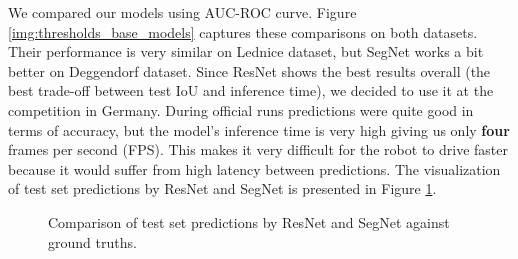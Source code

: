 We compared our models using AUC-ROC curve. Figure \ref{img:thresholds_base_models} captures
these comparisons on both datasets. Their performance is very similar on Lednice dataset, but
SegNet works a bit better on Deggendorf dataset.
Since ResNet shows the best results overall (the best trade-off between test IoU and
inference time), we decided to use it at the competition in
Germany. During official runs predictions were quite good in terms of accuracy, but
the model's inference time is very high giving us only \textbf{four} frames per second (FPS).
This makes it very difficult for the robot to drive faster because it would suffer from
high latency between predictions. The visualization of test set predictions by ResNet and
SegNet is presented in Figure \ref{img:predictions_led_degg}.

\begin{figure}[!h]
	\begin{center}
		\hspace{0.01em}
	\end{center}
	\caption[Comparison of predictions against ground truths]{Comparison of test set predictions by ResNet and SegNet against ground truths.}
	\label{img:predictions_led_degg}
\end{figure}

